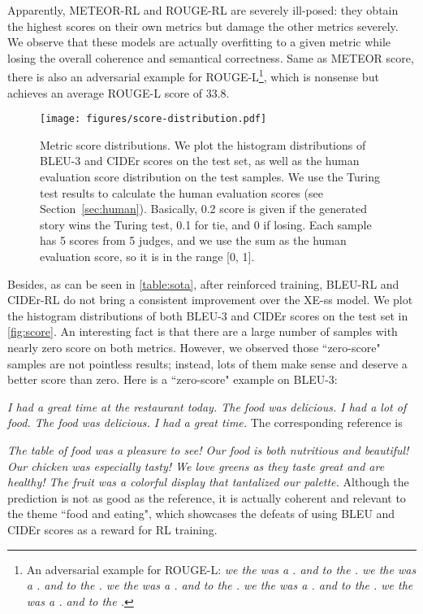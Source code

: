 \documentclass[11pt,a4paper]{article}
\newenvironment{myquote}[1]{\list{}{\leftmargin=#1\rightmargin=#1}\item[]}{\endlist}
\begin{document}
Apparently, METEOR-RL and ROUGE-RL are severely ill-posed: they obtain the highest scores on their own metrics but damage the other metrics severely. We observe that these models are actually overfitting to a given metric while losing the overall coherence and semantical correctness. Same as METEOR score, there is also an adversarial example for ROUGE-L\footnote{An adversarial example for ROUGE-L: \textit{we the was a . and to the . we the was a . and to the . we the was a . and to the . we the was a . and to the . we the was a . and to the .}}, which is nonsense but achieves an average ROUGE-L score of 33.8.

\begin{figure*}
\vspace{-1ex}
\centering
\texttt{[image: figures/score-distribution.pdf]}  
\vspace*{-4ex}
\caption{Metric score distributions. We plot the histogram distributions of BLEU-3 and CIDEr scores on the test set, as well as the human evaluation score distribution on the test samples. We use the Turing test results to calculate the human evaluation scores (see Section~\ref{sec:human}). Basically, 0.2 score is given if the generated story wins the Turing test, 0.1 for tie, and 0 if losing. Each sample has 5 scores from 5 judges, and we use the sum as the human evaluation score, so it is in the range [0, 1]. }
\label{fig:score}
\end{figure*}

Besides, as can be seen in \autoref{table:sota}, after reinforced training, BLEU-RL and CIDEr-RL do not bring a consistent improvement over the XE-ss model. We plot the histogram distributions of both BLEU-3 and CIDEr scores on the test set in \autoref{fig:score}. 
An interesting fact is that there are a large number of samples with nearly zero score on both metrics. However, we observed those ``zero-score" samples are not pointless results; instead, lots of them make sense and deserve a better score than zero. Here is a ``zero-score" example on BLEU-3:
\begin{myquote}{0.2in}
\textit{I had a great time at the restaurant today. The food was delicious. I had a lot of food. The food was delicious. I had a great time.} 
\end{myquote}
The corresponding reference is 
\begin{myquote}{0.2in}
\textit{The table of food was a pleasure to see! Our food is both nutritious and beautiful! Our chicken was especially tasty! We love greens as they taste great and are healthy! The fruit was a colorful display that tantalized our palette.}
\end{myquote}
Although the prediction is not as good as the reference, it is actually coherent and relevant to the theme ``food and eating", which showcases the defeats of using BLEU and CIDEr scores as a reward for RL training.
\end{document}
